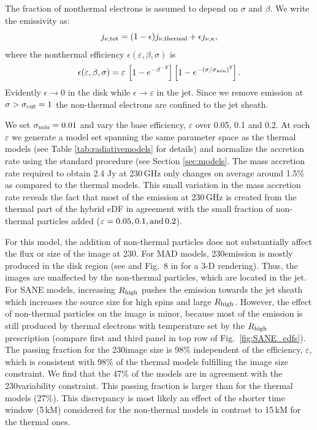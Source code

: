 The fraction of nonthermal electrons is assumed to depend on $\sigma$ and $\beta$.
We write the emissivity as:
\begin{equation}
  j_{\nu,\rm{tot}}=(1-\epsilon) j_{\nu,\rm{thermal}} + \epsilon j_{\nu, \kappa},
  \label{eq:kappaeff}
\end{equation}
where the nonthermal efficiency $\epsilon( \varepsilon, \beta, \sigma)$ is
\begin{equation}
  \epsilon(\varepsilon,\beta,\sigma)=\varepsilon\,
  \left[1 - e^{-\beta^{-2}}\right]
  \left[1-e^{-(\sigma/\sigma_{\rm min})^2}\right].
  \label{eq:efficiencybetasigma}
\end{equation}
Evidently $\epsilon \rightarrow 0$ in the disk while $\epsilon \rightarrow \varepsilon$ in the jet.
Since we remove emission at $\sigma > \sigma_{\rm cut} = 1$ the non-thermal electrons are confined to the jet sheath.

We set $\sigma_{\rm min}=0.01$ and vary the base efficiency, $\varepsilon$ over 0.05, 0.1 and 0.2.
At each $\varepsilon$ we generate a model set spanning the same parameter space as the thermal models (see Table \ref{tab:radiativemodels} for details) and normalize the accretion rate using the standard procedure (see Section \ref{sec:models}.
The mass accretion rate required to obtain 2.4 Jy at 230\,GHz only changes on average around 1.5\% as compared to the thermal models.
This small variation in the mass accretion rate reveals the fact that most of the emission at 230\,GHz is created from the thermal part of the hybrid eDF in agreement with the small fraction of non-thermal particles added ($\varepsilon=0.05,0.1,\rm{and}\,0.2$).

\label{varkappa230}

For this model, the addition of non-thermal particles does not substantially affect the flux or size of the image at 230\GHz.
For MAD models, 230\GHz emission is mostly produced in the disk region (see  and Fig.~8 in \citealt{Wong_2022} for a 3-D rendering).
Thus, the images are unaffected by the non-thermal particles, which are located in the jet.
For SANE models, increasing $R_\mathrm{high}$ pushes the emission towards the jet sheath which increases the source size for high spins and large $R_\mathrm{high}$.
However, the effect of non-thermal particles on the image is minor, because most of the emission is still produced by thermal electrons with temperature set by the $R_\mathrm{high}$ prescription (compare first and third panel in top row of Fig.~\ref{fig:SANE_edfs}).
The passing fraction for the 230\GHz image size is 98\% independent of the efficiency, $\varepsilon$, which is consistent with 98\% of the thermal models fulfilling the image size constraint.
We find that the 47\% of the models are in agreement with the 230\GHz variability constraint.
This passing fraction is larger than for the thermal models (27\%).
This discrepancy is most likely an effect of the shorter time window (5\,kM) considered for the non-thermal models in contrast to 15\,kM for the thermal ones.

